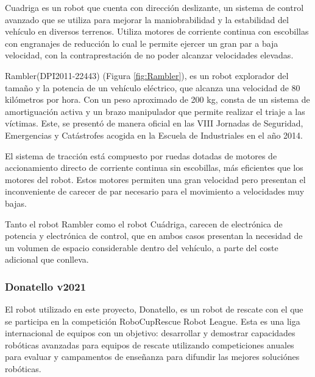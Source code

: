 

Cuadriga es un robot que cuenta con dirección deslizante, un sistema de control avanzado que se utiliza para mejorar la maniobrabilidad y la estabilidad del vehículo en diversos terrenos. Utiliza motores de corriente continua con escobillas con engranajes de reducción lo cual le permite ejercer un gran par a baja velocidad, con la contraprestación de no poder alcanzar velocidades elevadas.


Rambler(DPI2011-22443) (Figura \ref{fig:Rambler}), es un robot explorador del tamaño y la potencia de un vehículo eléctrico, que alcanza una velocidad de 80 kilómetros por hora. Con un peso aproximado de 200 kg, consta de un sistema de amortiguación activa y un brazo manipulador que permite realizar el triaje a las víctimas. Este, se presentó de manera oficial en las VIII Jornadas de Seguridad, Emergencias y Catástrofes acogida en la Escuela de Industriales en el año 2014. 

El sistema de tracción está compuesto por ruedas dotadas de motores de accionamiento directo de corriente continua sin escobillas, más eficientes que los motores del robot. Estos motores permiten una gran velocidad pero presentan el inconveniente de carecer de par necesario para el movimiento a velocidades muy bajas.

Tanto el robot Rambler como el robot Cuádriga, carecen de electrónica de potencia y electrónica de control, que en ambos casos presentan la necesidad de un volumen de espacio considerable dentro del vehículo, a parte del coste adicional que conlleva.

\subsubsection{Donatello v2021}

El robot utilizado en este proyecto, Donatello, es un robot de rescate con el que se participa en la competición RoboCupRescue Robot League. Esta es una liga internacional de equipos con un objetivo: desarrollar y demostrar capacidades robóticas avanzadas para equipos de rescate utilizando competiciones anuales para evaluar y campamentos de enseñanza para difundir las mejores soluciónes robóticas.

